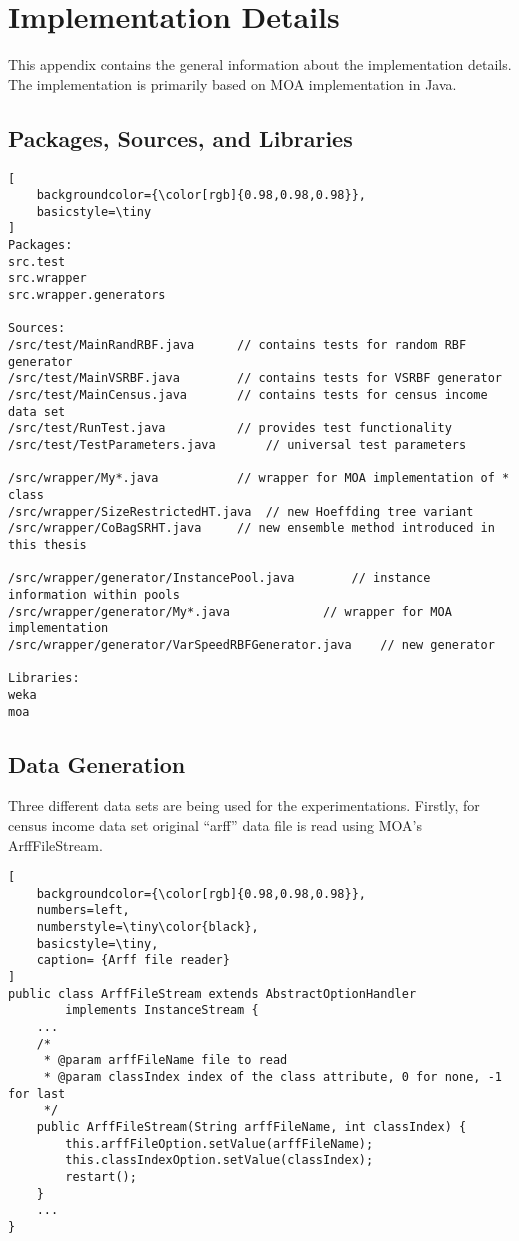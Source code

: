 \chapter{Implementation Details}

This appendix contains the general information about the implementation details. The implementation is primarily based on MOA implementation in Java.

\section*{Packages, Sources, and Libraries}
\begin{lstlisting}[
    backgroundcolor={\color[rgb]{0.98,0.98,0.98}},
    basicstyle=\tiny
]
Packages:
src.test
src.wrapper
src.wrapper.generators

Sources:
/src/test/MainRandRBF.java		// contains tests for random RBF generator
/src/test/MainVSRBF.java		// contains tests for VSRBF generator
/src/test/MainCensus.java		// contains tests for census income data set
/src/test/RunTest.java			// provides test functionality
/src/test/TestParameters.java		// universal test parameters

/src/wrapper/My*.java			// wrapper for MOA implementation of * class
/src/wrapper/SizeRestrictedHT.java	// new Hoeffding tree variant
/src/wrapper/CoBagSRHT.java		// new ensemble method introduced in this thesis

/src/wrapper/generator/InstancePool.java		// instance information within pools
/src/wrapper/generator/My*.java				// wrapper for MOA implementation
/src/wrapper/generator/VarSpeedRBFGenerator.java	// new generator

Libraries:
weka
moa
\end{lstlisting}

\section*{Data Generation}
Three different data sets are being used for the experimentations. Firstly, for census income data set original ``arff'' data file is read using MOA's ArffFileStream.

\begin{lstlisting}[
    backgroundcolor={\color[rgb]{0.98,0.98,0.98}},
    numbers=left,
    numberstyle=\tiny\color{black},
    basicstyle=\tiny,
    caption= {Arff file reader}
]
public class ArffFileStream extends AbstractOptionHandler
        implements InstanceStream {
    ...
    /*
     * @param arffFileName file to read
     * @param classIndex index of the class attribute, 0 for none, -1 for last
     */
    public ArffFileStream(String arffFileName, int classIndex) {
        this.arffFileOption.setValue(arffFileName);
        this.classIndexOption.setValue(classIndex);
        restart();
    }
    ...
}
\end{lstlisting}

